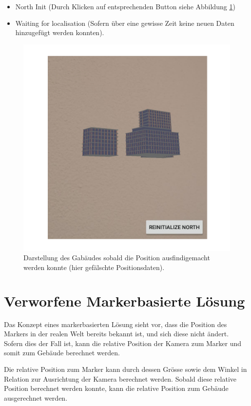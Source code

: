 \documentclass[a4paper]{scrreprt}
\begin{document}
\begin{itemize}
	\item North Init (Durch Klicken auf entsprechenden Button siehe Abbildung \ref{fig:ARShowBuilding})
	\item Waiting for localisation (Sofern über eine gewisse Zeit keine neuen Daten hinzugefügt werden konnten).
\end{itemize}

\begin{figure}[h!]
	\includegraphics[keepaspectratio, width=\textwidth]{ARShowBuilding.png}
	\caption{Darstellung des Gabäudes sobald die Position ausfindigemacht werden konnte (hier gefälschte Positionsdaten).}
    \label{fig:ARShowBuilding}
\end{figure}

\clearpage

\section{Verworfene Markerbasierte Lösung}
Das Konzept eines markerbasierten Lösung sieht vor, dass die Position des Markers in der realen Welt bereits bekannt ist, und sich diese nicht ändert. Sofern dies der Fall ist, kann die relative Position der Kamera zum Marker und somit zum Gebäude berechnet werden.

Die relative Position zum Marker kann durch dessen Grösse sowie dem Winkel in Relation zur Ausrichtung der Kamera berechnet werden. Sobald diese relative Position berechnet werden konnte, kann die relative Position zum Gebäude ausgerechnet werden.
\end{document}
